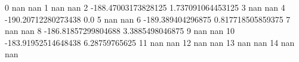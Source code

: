 0 nan nan
1 nan nan
2 -188.47003173828125 1.737091064453125
3 nan nan
4 -190.20712280273438 0.0
5 nan nan
6 -189.389404296875 0.817718505859375
7 nan nan
8 -186.81857299804688 3.3885498046875
9 nan nan
10 -183.91952514648438 6.28759765625
11 nan nan
12 nan nan
13 nan nan
14 nan nan
